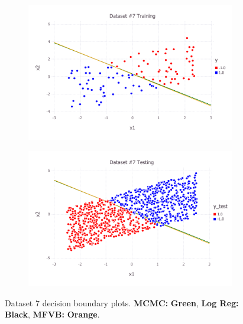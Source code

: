 \begin{figure}[h!]
\centering
    \begin{subfigure}[b]{0.45\textwidth}
	\includegraphics[scale=0.6]{figures/train_final_7.pdf}
    \end{subfigure}
    \quad
    \begin{subfigure}[b]{0.45\textwidth}
	\includegraphics[scale=0.6]{figures/test_final_7.pdf}
	\end{subfigure}
 \caption{Dataset 7 decision boundary plots. {\bf MCMC:}  {\bf \color{ao(english)} Green}, {\bf Log Reg:} {\bf \color{black} Black}, {\bf MFVB:}  {\bf \color{burntorange} Orange}.}  \label{fig:dataset_7}  
\end{figure}

